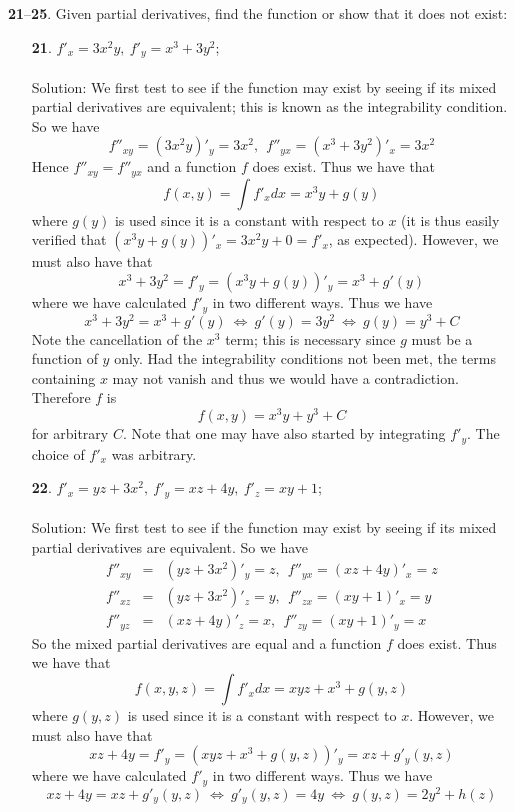 \documentclass[12pt]{amsbook}
\begin{document}
\noindent
{\small {\bf 21}--{\bf 25}}. Given partial derivatives, find the function or show that it does not exist:
\begin{enumerate}
\item[{\small\bf 21}.] $f'_x=3x^2y ,\ f'_y=x^3+3y^2 $;
\\
\\
{\sc Solution}: We first test to see if the function may exist by seeing if its mixed partial derivatives are equivalent; this is known as the integrability condition. So we have
$$f''_{xy}=(3x^2y)'_y=3x^2, \ \ f''_{yx}=(x^3+3y^2)'_x=3x^2$$
Hence $f''_{xy}=f''_{yx}$ and a function $f$ does exist. Thus we have that
$$f(x,y)=\int f'_x dx = x^3y+g(y)$$
where $g(y)$ is used since it is a constant with respect to $x$ (it is thus easily verified that $(x^3y+g(y))'_x=3x^2y+0=f'_x$, as expected). However, we must also have that
$$x^3+3y^2=f'_y=(x^3y+g(y))'_y=x^3+g'(y)$$
where we have calculated $f'_y$ in two different ways. Thus we have
$$x^3+3y^2=x^3+g'(y) \ \Leftrightarrow \ g'(y)=3y^2 \ \Leftrightarrow \ g(y)=y^3+C$$
Note the cancellation of the $x^3$ term; this is necessary since $g$ must be a function of $y$ only. Had the integrability conditions not been met, the terms containing $x$ may not vanish and thus we would have a contradiction. Therefore $f$ is 
$$f(x,y)=x^3y+y^3+C$$
for arbitrary $C$. Note that one may have also started by integrating $f'_y$. The choice of $f'_x$ was arbitrary. 
\\
\item[{\small\bf 22}.] $f'_x=yz+3x^2 ,\ f'_y=xz+4y ,\ f'_z=xy+1 $;
\\
\\
{\sc Solution}: We first test to see if the function may exist by seeing if its mixed partial derivatives are equivalent. So we have
\begin{eqnarray*}
f''_{xy}&=&(yz+3x^2)'_y=z, \ \ f''_{yx}=(xz+4y)'_x=z \\
f''_{xz}&=&(yz+3x^2)'_z=y, \ \ f''_{zx}=(xy+1)'_x=y \\
f''_{yz}&=&(xz+4y)'_z=x, \ \ f''_{zy}=(xy+1)'_y=x 
\end{eqnarray*}
So the mixed partial derivatives are equal and a function $f$ does exist. Thus we have that
$$f(x,y,z)=\int f'_x dx = xyz+x^3+g(y,z)$$
where $g(y,z)$ is used since it is a constant with respect to $x$. However, we must also have that
$$xz+4y=f'_y=(xyz+x^3+g(y,z))'_y=xz+g'_y(y,z)$$
where we have calculated $f'_y$ in two different ways. Thus we have
$$xz+4y=xz+g'_y(y,z) \ \Leftrightarrow \ g'_y(y,z)=4y \ \Leftrightarrow \ g(y,z)=2y^2+h(z)$$

\end{enumerate}
\end{document}
